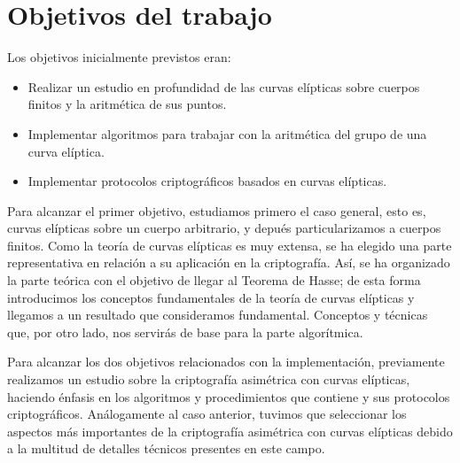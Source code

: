 \chapter{Objetivos del trabajo}
\label{ch:Objetivos del trabajo}



Los objetivos inicialmente previstos eran:
\begin{itemize}
    \item Realizar un estudio en profundidad de las curvas elípticas sobre cuerpos finitos y la aritmética de sus puntos.
    \item Implementar algoritmos para trabajar con la aritmética del grupo de una curva elíptica.
    \item Implementar protocolos criptográficos basados en curvas elípticas.
\end{itemize}

Para alcanzar el primer objetivo, estudiamos primero el caso general, esto es, curvas elípticas sobre un cuerpo arbitrario, y depués particularizamos a cuerpos finitos. Como la teoría de curvas elípticas es muy extensa, se ha elegido una parte representativa en relación a su aplicación en la criptografía. Así, se ha organizado la parte teórica con el objetivo de llegar al Teorema de Hasse; de esta forma introducimos los conceptos fundamentales de la teoría de curvas elípticas y llegamos a un resultado que consideramos fundamental. Conceptos y técnicas que, por otro lado, nos servirás de base para la parte algorítmica.

Para alcanzar los dos objetivos relacionados con la implementación, previamente realizamos un estudio sobre la criptografía asimétrica con curvas elípticas, haciendo énfasis en los algoritmos y procedimientos que contiene y sus protocolos criptográficos. Análogamente al caso anterior, tuvimos que seleccionar los aspectos más importantes de la criptografía asimétrica con curvas elípticas debido a la multitud de detalles técnicos presentes en este campo.

